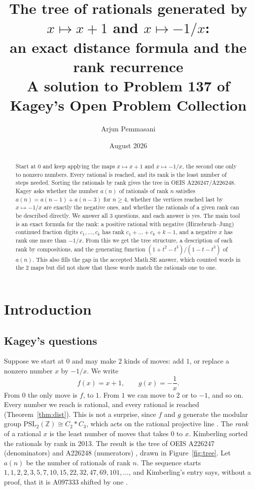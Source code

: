 \documentclass[11pt]{article}
\title{The tree of rationals generated by $x\mapsto x+1$ and $x\mapsto -1/x$:\\
 an exact distance formula and the rank recurrence\\[1ex]
 \large A solution to Problem 137 of Kagey's Open Problem Collection}
\author{Arjun Pemmasani}
\date{August 2026}
\theoremstyle{definition}
\theoremstyle{remark}
\newcommand{\Z}{\mathbb{Z}}
\begin{document}
\maketitle

\begin{abstract}
Start at $0$ and keep applying the maps $x\mapsto x+1$ and $x\mapsto -1/x$, the second one only to
nonzero numbers. Every rational is reached, and its rank is the least number of steps needed.
Sorting the rationals by rank gives the tree in OEIS A226247/A226248. Kagey asks whether the number
$a(n)$ of rationals of rank $n$ satisfies $a(n)=a(n-1)+a(n-3)$ for $n\ge4$, whether the vertices
reached last by $x\mapsto-1/x$ are exactly the negative ones, and whether the rationals of a given
rank can be described directly. We answer all 3 questions, and each answer is yes. The main tool is
an exact formula for the rank: a positive rational with negative (Hirzebruch--Jung) continued
fraction digits $c_1,\dots,c_k$ has rank $c_1+\dots+c_k+k-1$, and a negative $x$ has rank one more
than $-1/x$. From this we get the tree structure, a description of each rank by compositions, and
the generating function $(1+t^2-t^3)/(1-t-t^3)$ of $a(n)$. This also fills the gap in the accepted
Math.SE answer, which counted words in the 2 maps but did not show that these words match the
rationals one to one.
\end{abstract}

\section{Introduction}\label{sec:intro}

\subsection{Kagey's questions}

Suppose we start at $0$ and may make 2 kinds of moves: add $1$, or replace a nonzero number $x$
by $-1/x$. We write
\[
f(x)=x+1, \qquad g(x)=-\frac1x .
\]
From $0$ the only move is $f$, to $1$. From $1$ we can move to $2$ or to $-1$, and so on. Every
number we reach is rational, and every rational is reached (Theorem~\ref{thm:dist}). This is not a
surprise, since $f$ and $g$ generate the modular group $\mathrm{PSL}_2(\Z)\cong C_2*C_3$, which acts
on the rational projective line \cite{serre1980,alperin1993}. The \emph{rank} of a rational $x$ is
the least number of moves that takes $0$ to $x$. Kimberling \cite{oeisA226247} sorted the
rationals by rank in 2013. The result is the tree of OEIS A226247 (denominators) and A226248
(numerators) \cite{oeisA226247,oeisA226248}, drawn in Figure~\ref{fig:tree}. Let $a(n)$ be the
number of rationals of rank $n$. The sequence starts
$1,1,2,2,3,5,7,10,15,22,32,47,69,101,\dots$, and Kimberling's entry says, without a proof, that it
is A097333 shifted by one \cite{oeisA097333}.
\end{document}
